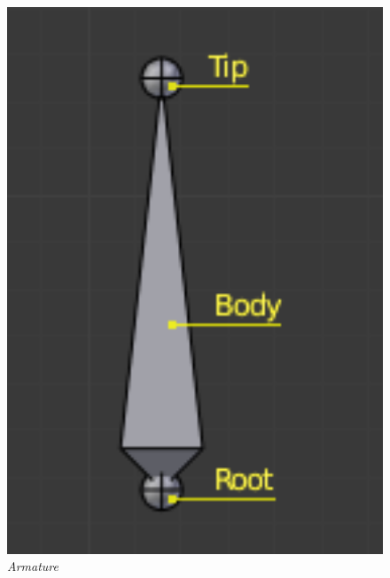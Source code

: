 \begin{figure}[ht]
    \centering
    \includegraphics[width=1.0\textwidth]{resources/chapter-2-bone-structure.png}
    \caption{\textit{Armature} \parencite{blender-armature-structure}}
    \label{fig:bone-structure}
\end{figure}


